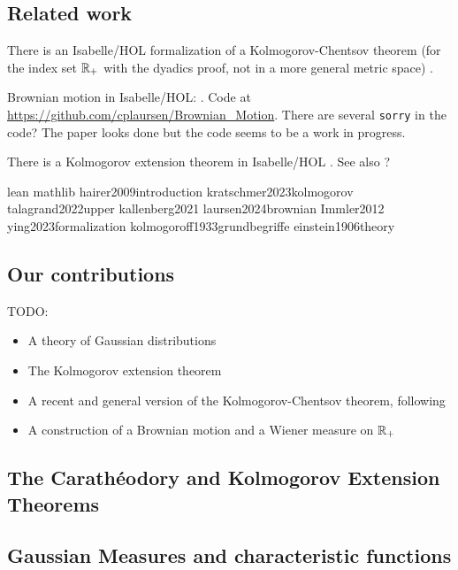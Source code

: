 \documentclass[lean]{DraftAFM}
\begin{document}
\subsection{Related work}

There is an Isabelle/HOL formalization of a Kolmogorov-Chentsov theorem (for the index set $\mathbb{R}_+$ with the dyadics proof, not in a more general metric space) \cite{Kolmogorov_Chentsov-AFP}.

Brownian motion in Isabelle/HOL: \cite{laursen2024brownian}.
Code at \href{https://github.com/cplaursen/Brownian_Motion}{https://github.com/cplaursen/Brownian\_Motion}. There are several \lstinline|sorry| in the code? The paper looks done but the code seems to be a work in progress.

There is a Kolmogorov extension theorem in Isabelle/HOL \cite{Immler2012}. See also \cite{holzl2017markov} ?



\nocite{durrett2019probability}
\nocite{wiener1923differential}
\nocite{Kolmogorov_Chentsov-AFP}
\nocite{Monticone_LeanProject_2025}
\nocite{}
\nocite{}



lean
mathlib
hairer2009introduction
kratschmer2023kolmogorov
talagrand2022upper
kallenberg2021
laursen2024brownian
Immler2012
ying2023formalization
kolmogoroff1933grundbegriffe
einstein1906theory


\subsection{Our contributions}

TODO:
\begin{itemize}
  \item A theory of Gaussian distributions
  \item The Kolmogorov extension theorem
  \item A recent and general version of the Kolmogorov-Chentsov theorem, following \cite{kratschmer2023kolmogorov}
  \item A construction of a Brownian motion and a Wiener measure on $\mathbb{R}_+$
\end{itemize}

\subsection{The Carathéodory and Kolmogorov Extension Theorems}

\subsection{Gaussian Measures and characteristic functions}
\end{document}
